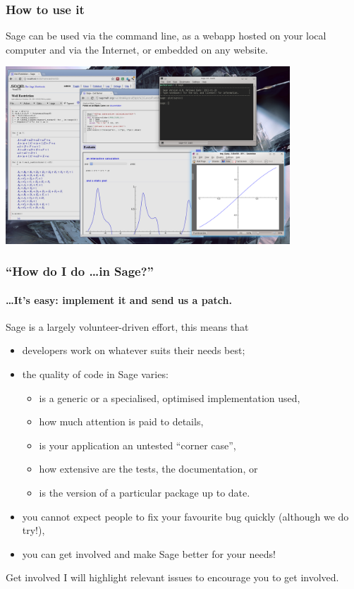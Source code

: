 \documentclass[10pt]{beamer}
\begin{document}
\begin{frame}
\frametitle{How to use it}
Sage can be used via the command line, as a webapp hosted on your local computer and via the Internet, or embedded on any website.

\begin{center}
\includegraphics[width=0.8\textwidth]{sage-desktop.png}
\end{center}

\end{frame}


\begin{frame}
\frametitle{``How do I do \dots in Sage?''}
\framesubtitle{\hfill \dots It's easy: implement it and send us a patch.}

Sage is a largely volunteer-driven effort, this means that
\begin{itemize}
 \item developers work on whatever suits their needs best;
 \item the quality of code in Sage varies:
 \begin{itemize}
   \item is a generic or a specialised, optimised implementation used,
   \item how much attention is paid to details,
   \item is your application an untested ``corner case'',
   \item how extensive are the tests, the documentation, or
   \item is the version of a particular package up to date.
 \end{itemize}
 \item you cannot expect people to fix your favourite bug quickly (although we do try!),
 \item you can get involved and make Sage better for your needs!
\end{itemize}


\begin{block}{Get involved}
I will highlight relevant issues to encourage you to get involved.
\end{block}
\end{frame}
\end{document}
